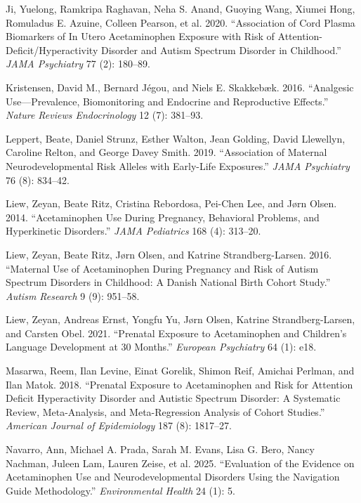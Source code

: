 \documentclass[12pt]{article}
\begin{document}
\begin{thebibliography}{99}
Ji, Yuelong, Ramkripa Raghavan, Neha S. Anand, Guoying Wang, Xiumei Hong, Romuladus E. Azuine, Colleen Pearson, et al. 2020. ``Association of Cord Plasma Biomarkers of In Utero Acetaminophen Exposure with Risk of Attention-Deficit/Hyperactivity Disorder and Autism Spectrum Disorder in Childhood.'' \textit{JAMA Psychiatry} 77 (2): 180--89.

Kristensen, David M., Bernard Jégou, and Niels E. Skakkebæk. 2016. ``Analgesic Use---Prevalence, Biomonitoring and Endocrine and Reproductive Effects.'' \textit{Nature Reviews Endocrinology} 12 (7): 381--93.

Leppert, Beate, Daniel Strunz, Esther Walton, Jean Golding, David Llewellyn, Caroline Relton, and George Davey Smith. 2019. ``Association of Maternal Neurodevelopmental Risk Alleles with Early-Life Exposures.'' \textit{JAMA Psychiatry} 76 (8): 834--42.

Liew, Zeyan, Beate Ritz, Cristina Rebordosa, Pei-Chen Lee, and Jørn Olsen. 2014. ``Acetaminophen Use During Pregnancy, Behavioral Problems, and Hyperkinetic Disorders.'' \textit{JAMA Pediatrics} 168 (4): 313--20.

Liew, Zeyan, Beate Ritz, Jørn Olsen, and Katrine Strandberg-Larsen. 2016. ``Maternal Use of Acetaminophen During Pregnancy and Risk of Autism Spectrum Disorders in Childhood: A Danish National Birth Cohort Study.'' \textit{Autism Research} 9 (9): 951--58.

Liew, Zeyan, Andreas Ernst, Yongfu Yu, Jørn Olsen, Katrine Strandberg-Larsen, and Carsten Obel. 2021. ``Prenatal Exposure to Acetaminophen and Children's Language Development at 30 Months.'' \textit{European Psychiatry} 64 (1): e18.

Masarwa, Reem, Ilan Levine, Einat Gorelik, Shimon Reif, Amichai Perlman, and Ilan Matok. 2018. ``Prenatal Exposure to Acetaminophen and Risk for Attention Deficit Hyperactivity Disorder and Autistic Spectrum Disorder: A Systematic Review, Meta-Analysis, and Meta-Regression Analysis of Cohort Studies.'' \textit{American Journal of Epidemiology} 187 (8): 1817--27.

Navarro, Ann, Michael A. Prada, Sarah M. Evans, Lisa G. Bero, Nancy Nachman, Juleen Lam, Lauren Zeise, et al. 2025. ``Evaluation of the Evidence on Acetaminophen Use and Neurodevelopmental Disorders Using the Navigation Guide Methodology.'' \textit{Environmental Health} 24 (1): 5.


\end{thebibliography}
\end{document}
